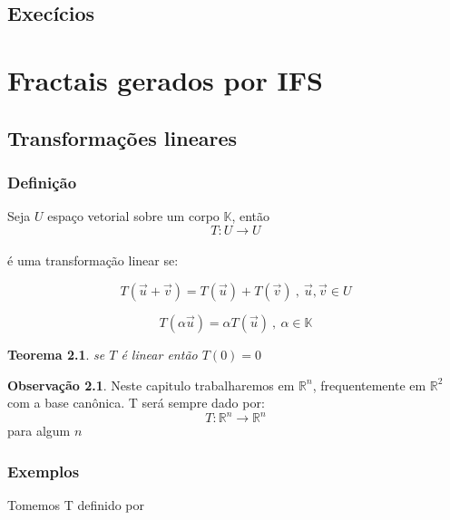 \documentclass[12pt]{report}
\newtheorem{theorem}{Teorema}
\theoremstyle{definition}
\newtheorem*{remark}{Observação}
\begin{document}
\section{Execícios}


\chapter{Fractais gerados por IFS}
\section{Transformações lineares}
\subsection{Definição}

Seja $U$ espaço vetorial sobre um corpo \( \mathbb{K} \), então
\[T:U \longrightarrow U\]
\\
é uma transformação linear se:

\begin{equation}
    T(\Vec{u} + \Vec{v}) = T(\Vec{u}) + T(\Vec{v})\ , \ \Vec{u}, \Vec{v} \in U
\end{equation}

\begin{equation}
    T(\alpha\Vec{u}) = \alpha T(\Vec{u}) \ , \ \alpha \in \mathbb{K}
\end{equation}

\begin{theorem}
se \(T\) é linear então \( T(0) = 0 \)
\end{theorem}

\begin{remark}
Neste capitulo trabalharemos em \( \mathbb{R}^{n} \), frequentemente em \( \mathbb{R}^{2} \) com a base canônica. T será sempre dado por:
\[ T: \mathbb{R}^n \longrightarrow \mathbb{R}^n \]
para algum \(n\)
\end{remark}

\subsection{Exemplos}

Tomemos T definido por
\end{document}
